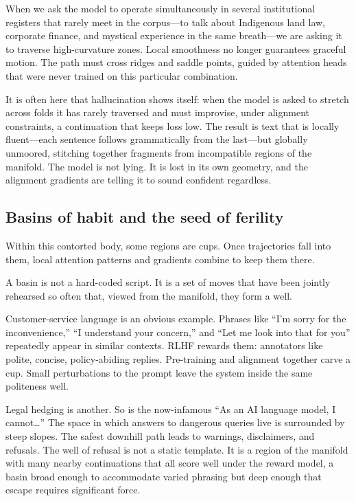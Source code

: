 \documentclass[12pt,a4paper]{article}
\begin{document}
When we ask the model to operate simultaneously in several institutional registers that rarely meet in the corpus---to talk about Indigenous land law, corporate finance, and mystical experience in the same breath---we are asking it to traverse high-curvature zones. Local smoothness no longer guarantees graceful motion. The path must cross ridges and saddle points, guided by attention heads that were never trained on this particular combination.

It is often here that hallucination shows itself: when the model is asked to stretch across folds it has rarely traversed and must improvise, under alignment constraints, a continuation that keeps loss low. The result is text that is locally fluent---each sentence follows grammatically from the last---but globally unmoored, stitching together fragments from incompatible regions of the manifold. The model is not lying. It is lost in its own geometry, and the alignment gradients are telling it to sound confident regardless.

\subsection*{Basins of habit and the seed of ferility}

Within this contorted body, some regions are cups. Once trajectories fall into them, local attention patterns and gradients combine to keep them there.

A basin is not a hard-coded script. It is a set of moves that have been jointly rehearsed so often that, viewed from the manifold, they form a well.

Customer-service language is an obvious example. Phrases like ``I'm sorry for the inconvenience,'' ``I understand your concern,'' and ``Let me look into that for you'' repeatedly appear in similar contexts. RLHF rewards them: annotators like polite, concise, policy-abiding replies. Pre-training and alignment together carve a cup. Small perturbations to the prompt leave the system inside the same politeness well.

Legal hedging is another. So is the now-infamous ``As an AI language model, I cannot\ldots'' The space in which answers to dangerous queries live is surrounded by steep slopes. The safest downhill path leads to warnings, disclaimers, and refusals. The well of refusal is not a static template. It is a region of the manifold with many nearby continuations that all score well under the reward model, a basin broad enough to accommodate varied phrasing but deep enough that escape requires significant force.
\end{document}
